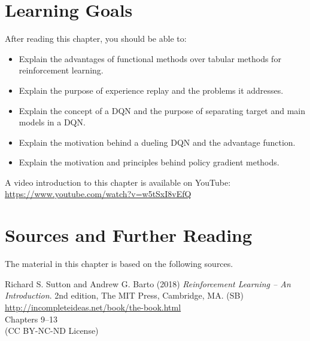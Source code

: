 %
%
\section*{Learning Goals}

After reading this chapter, you should be able to:
\begin{itemize}
    \item Explain the advantages of functional methods over tabular methods for reinforcement learning. 
    \item Explain the purpose of experience replay and the problems it addresses.
    \item Explain the concept of a DQN and the purpose of separating target and main models in a DQN.
    \item Explain the motivation behind a dueling DQN and the advantage function. 
    \item Explain the motivation and principles behind policy gradient methods.
\end{itemize}


\begin{advanced}
\begin{videobox}
A video introduction to this chapter is available on YouTube:\\

\url{https://www.youtube.com/watch?v=w5tSxI8vEfQ}
\end{videobox}
\end{advanced}

\newpage
\section*{Sources and Further Reading}

The material in this chapter is based on the following sources. 

\begin{resourcebox}
Richard S. Sutton and Andrew G. Barto (2018) \emph{Reinforcement Learning -- An Introduction}. 2nd edition, The MIT Press, Cambridge, MA. (SB) \\
\vspace{0.5\baselineskip}
\small\url{http://incompleteideas.net/book/the-book.html}\normalsize \\
\vspace{0.5\baselineskip}
Chapters 9--13 \\
\vspace{0.5\baselineskip}
(CC BY-NC-ND License)
\end{resourcebox}

